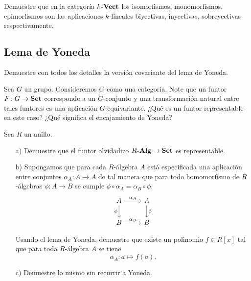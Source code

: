 \begin{ejerc}
  Demuestre que en la categoría $k\text{\bf -Vect}$ los isomorfismos,
  monomorfismos, epimorfismos son las aplicaciones $k$-lineales biyectivas,
  inyectivas, sobreyectivas respectivamente.
\end{ejerc}

\subsection*{Lema de Yoneda}

\begin{ejerc}
  Demuestre con todos los detalles la versión covariante del lema de Yoneda.
\end{ejerc}

\begin{ejerc}
  Sea $G$ un grupo. Consideremos $G$ como una categoría. Note que un funtor
  $F\colon G\to \text{\bf Set}$ corresponde a un $G$-conjunto y una transformación
  natural entre tales funtores es una aplicación $G$-equivariante. ¿Qué es un
  funtor representable en este caso? ¿Qué significa el encajamiento de Yoneda?
\end{ejerc}

\begin{ejerc}
  Sea $R$ un anillo.

  \begin{enumerate}
  \item[a)] Demuestre que el funtor olvidadizo $R\text{\bf -Alg} \to \text{\bf Set}$
    es representable.

  \item[b)] Supongamos que para cada $R$-álgebra $A$ está especificada una
    aplicación entre conjuntos $\alpha_A\colon A \to A$ de tal manera que para
    todo homomorfismo de $R$-álgebras $\phi\colon A \to B$ se cumple
    $\phi \circ \alpha_A = \alpha_B \circ \phi$.
    \[ \begin{tikzcd}
        A \ar{r}{\alpha_A}\ar{d}[swap]{\phi} & A\ar{d}{\phi} \\
        B \ar{r}{\alpha_B} & B
      \end{tikzcd} \]

    Usando el lema de Yoneda, demuestre que existe un polinomio $f \in R[x]$ tal
    que para toda $R$-álgebra $A$ se tiene
    $$\alpha_A\colon a \mapsto f (a).$$

  \item[c)] Demuestre lo mismo sin recurrir a Yoneda.
  \end{enumerate}
\end{ejerc}

